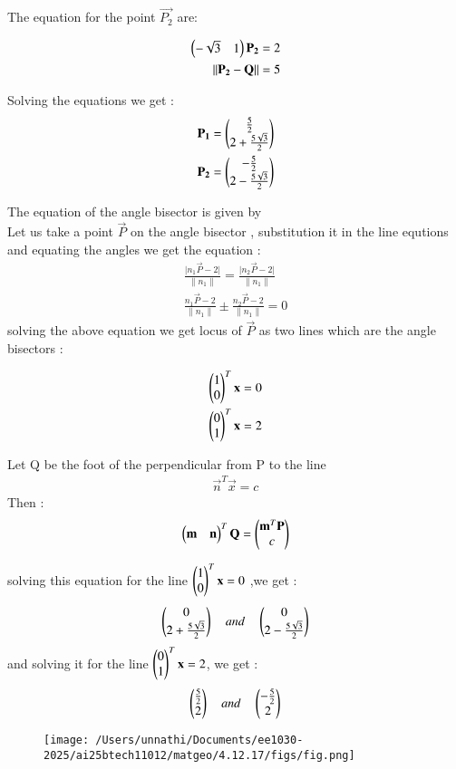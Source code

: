 \documentclass[journal]{IEEEtran}
\begin{document}
The equation for the point $\vec{P_2}$ are:

\begin{align}
\begin{pmatrix}-\sqrt{3} & 1\end{pmatrix}\mathbf{P_2} = 2\\
\lVert \mathbf{P_2} -  \mathbf{Q} \rVert = 5
\end{align}

Solving the equations we get :
\begin{align}
   \mathbf{P_1} = \begin{pmatrix}\frac{5}{2} \\ 2+\frac{5\sqrt{3}}{2}\end{pmatrix} \\
    \mathbf{P_2} = \begin{pmatrix}-\frac{5}{2} \\ 2-\frac{5\sqrt{3}}{2}\end{pmatrix}
\end{align}

The equation of the angle bisector is given by \\
Let us take a point $\vec{P}$ on the angle bisector , substitution it in the line equtions and equating the angles we get the equation :
\begin{align}
  \frac{\lvert n_1\vec{P} - 2 \rvert}{\lVert n_1\rVert}  =  \frac{\lvert n_2\vec{P} - 2 \rvert}{\lVert n_1\rVert} \\
  \frac{n_1\vec{P} - 2}{\lVert n_1\rVert} \pm \frac{ n_2\vec{P} - 2}{\lVert n_1\rVert} = 0
\end{align}
solving the above equation we get locus of $\vec{P}$ as two lines which are the angle bisectors :

\begin{align}
    \begin{pmatrix}1\\0\end{pmatrix}^{T}\mathbf{x} = 0\\
     \begin{pmatrix}0\\1\end{pmatrix}^{T}\mathbf{x} = 2
\end{align}

Let Q be the foot of the perpendicular from P to the line
\begin{align}
    \vec{n}^{T}\vec{x} = c
\end{align}
Then :
\begin{align}
    \begin{pmatrix}\mathbf{m}&\mathbf{n}\end{pmatrix}^{T}\mathbf{Q} = \begin{pmatrix}\mathbf{m}^{T}\mathbf{P}\\c\end{pmatrix}
\end{align}

solving this equation for the line $\begin{pmatrix}1\\0\end{pmatrix}^{T}\mathbf{x} = 0$ ,we get :
\begin{align}
    \begin{pmatrix}0\\2+\frac{5\sqrt{3}}{2}\end{pmatrix} \quad and \quad \begin{pmatrix}0\\2-\frac{5\sqrt{3}}{2}\end{pmatrix}
\end{align}
and solving it for the line $\begin{pmatrix}0\\1\end{pmatrix}^{T}\mathbf{x} = 2$, we get :
\begin{align}
    \begin{pmatrix}\frac{5}{2} \\ 2\end{pmatrix} \quad and \quad \begin{pmatrix}-\frac{5}{2} \\ 2\end{pmatrix}
\end{align}



\begin{figure}[h!]
   \centering
   \texttt{[image: /Users/unnathi/Documents/ee1030-2025/ai25btech11012/matgeo/4.12.17/figs/fig.png]}
   \caption{}
   \label{stemplot}
\end{figure}
\end{document}
